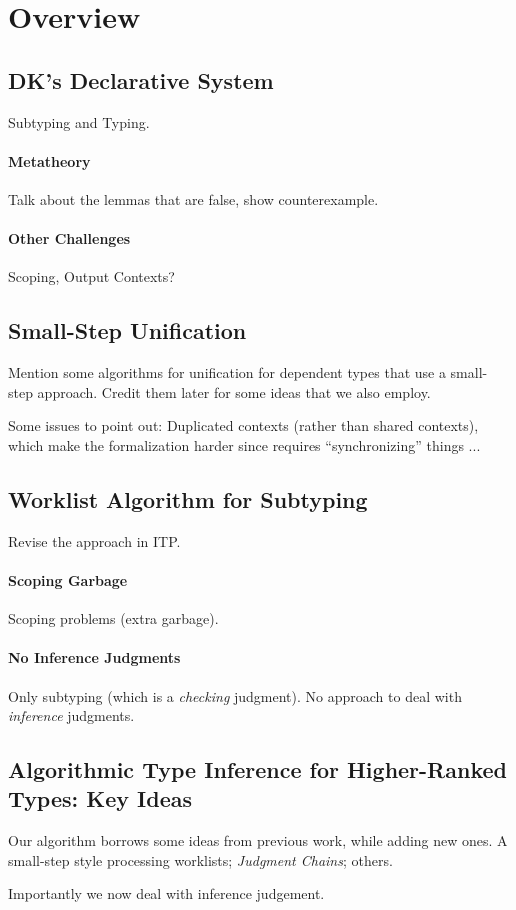 \section{Overview}


\subsection{DK's Declarative System}
Subtyping and Typing. 

\paragraph{Metatheory} Talk about the lemmas that are false, show counterexample. 

\paragraph{Other Challenges} Scoping, Output Contexts?

\subsection{Small-Step Unification} Mention some algorithms for unification for 
dependent types that use a small-step approach. Credit them later for some ideas that 
we also employ.

Some issues to point out: Duplicated contexts (rather than shared contexts), which make 
the formalization harder since requires ``synchronizing'' things ...

\subsection{Worklist Algorithm for Subtyping}

Revise the approach in ITP.

\paragraph{Scoping Garbage} Scoping problems (extra garbage).

\paragraph{No Inference Judgments} 
Only subtyping (which is a \emph{checking} judgment). 
No approach to deal with \emph{inference} judgments.

\subsection{Algorithmic Type Inference for Higher-Ranked Types: Key Ideas}

Our algorithm borrows some ideas from previous work, while adding new ones. 
A small-step style processing worklists; \emph{Judgment Chains}; others. 

Importantly we now deal with inference judgement.

